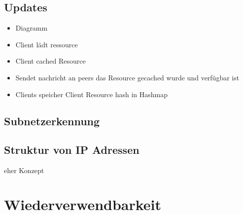 %

%
%


\subsection{ Updates }

\begin{itemize}
	\item Diagramm
	\item Client lädt ressource 
	\item Client cached Resource
	\item Sendet nachricht an peers das Resource gecached wurde und verfügbar ist
	\item Clients speicher Client Resource hash in Hashmap

\end{itemize}
\subsection{Subnetzerkennung}
\subsection{ Struktur von IP Adressen}
eher Konzept


\section{Wiederverwendbarkeit}
